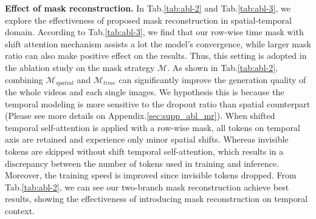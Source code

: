 \noindent \textbf{Effect of mask reconstruction.}
In Tab.\ref{tab:abl-2} and Tab.\ref{tab:abl-3}, we explore the effectiveness of proposed mask reconstruction in spatial-temporal domain. According to Tab.\ref{tab:abl-3}, we find that our row-wise time mask with shift attention mechanism assists a lot the model's convergence, while larger mask ratio can also make positive effect on the results. Thus, this setting is adopted in the ablation study on the mask strategy $\mathcal{M}$. As shown in Tab.\ref{tab:abl-2}, combining $\mathcal{M}_{spatial}$ and $\mathcal{M}_{time}$ can 
significantly improve the generation quality of the whole videos and each single images. We hypothesis this is because the temporal modeling is more sensitive to the dropout ratio than spatial counterpart (Please see more details on Appendix.\ref{sec:supp_abl_mr}). 
When shifted temporal self-attention is applied with a row-wise mask, all tokens on temporal axis are retained and experience only minor spatial shifts. Whereas invisible tokens are skipped without shift temporal self-attention, which results in a discrepancy between the number of tokens used in training and inference.
Moreover, the training speed is improved since invisible tokens dropped. From Tab.\ref{tab:abl-2}, we can see our two-branch mask reconstruction achieve best results, showing the effectiveness of introducing mask reconstruction on temporal context.

